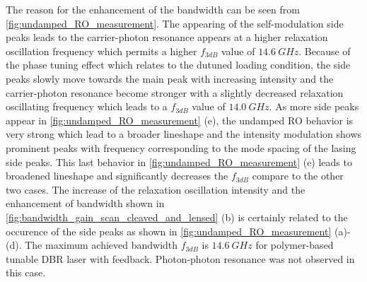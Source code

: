 The reason for the enhancement of the bandwidth can be seen from \autoref{fig:undamped_RO_measurement}. The appearing of the self-modulation side peaks leads to the carrier-photon resonance appears at a higher relaxation oscillation frequency which permits a higher $f_{3dB}$ value of $14.6 \ GHz$. Because of the phase tuning effect which relates to the dutuned loading condition, the side peaks slowly move towards the main peak with increasing intensity and the carrier-photon resonance become stronger with a slightly decreased relaxation oscillating frequency which leads to a $f_{3dB}$ value of $14.0 \ GHz$. As more side peaks appear in \autoref{fig:undamped_RO_measurement} (e), the undamped RO behavior is very strong which lead to a broader lineshape and the intensity modulation shows prominent peaks with frequency corresponding to the mode spacing of the lasing side peaks. This last behavior in \autoref{fig:undamped_RO_measurement} (e) leads to broadened lineshape and significantly decreases the $f_{3dB}$ compare to the other two cases. The increase of the relaxation oscillation intensity and the enhancement of bandwidth shown in \autoref{fig:bandwidth_gain_scan_cleaved_and_lensed} (b) is certainly related to the occurence of the side peaks as shown in \autoref{fig:undamped_RO_measurement} (a)-(d). The maximum achieved bandwidth $f_{3dB}$ is $14.6 \ GHz$ for polymer-based tunable DBR laser with feedback. Photon-photon resonance was not observed in this case.



